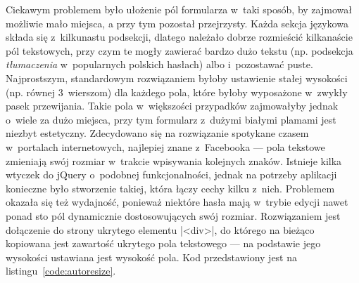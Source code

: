 Ciekawym problemem było ułożenie pól formularza w~taki sposób, by zajmował możliwie mało miejsca, a przy tym pozostał przejrzysty. Każda sekcja językowa składa się z~kilkunastu podsekcji, dlatego należało dobrze rozmieścić kilkanaście pól tekstowych, przy czym te mogły zawierać bardzo dużo tekstu (np. podsekcja \emph{tłumaczenia} w~popularnych polskich hasłach) albo i~pozostawać puste. Najprostszym, standardowym rozwiązaniem byłoby ustawienie stałej wysokości (np. równej 3~wierszom) dla każdego pola, które byłoby wyposażone w~zwykły pasek przewijania. Takie pola w~większości przypadków zajmowałyby jednak o~wiele za dużo miejsca, przy tym formularz z~dużymi białymi plamami jest niezbyt estetyczny. Zdecydowano się na rozwiązanie spotykane czasem w~portalach internetowych, najlepiej znane z~Facebooka --- pola tekstowe zmieniają swój rozmiar w~trakcie wpisywania kolejnych znaków. Istnieje kilka wtyczek do jQuery o~podobnej funkcjonalności, jednak na potrzeby aplikacji konieczne było stworzenie takiej, która łączy cechy kilku z~nich. Problemem okazała się też wydajność, ponieważ niektóre hasła mają w~trybie edycji nawet ponad sto pól dynamicznie dostosowujących swój rozmiar. Rozwiązaniem jest dołączenie do strony ukrytego elementu \kod|<div>|, do którego na bieżąco kopiowana jest zawartość ukrytego pola tekstowego --- na podstawie jego wysokości ustawiana jest wysokość pola. Kod przedstawiony jest na listingu~\ref{code:autoresize}.


